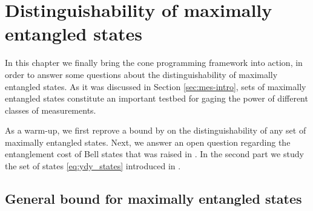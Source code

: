 \chapter{Distinguishability of maximally entangled states}
\label{chap:mes}

In this chapter we finally bring the cone programming framework into action, 
in order to answer some questions about the distinguishability of maximally entangled states.
As it was discussed in Section \ref{sec:mes-intro}, sets of maximally entangled states
constitute an important testbed for gaging the power of different classes of measurements.

As a warm-up, we first reprove a bound by \cite{Yu12} on the distinguishability
of any set of maximally entangled states.
Next, we answer an open question regarding the entanglement
cost of Bell states that was raised in \cite{Yu14}.
In the second part we study the set of states \eqref{eq:ydy_states} introduced in \cite{Yu12}. 

\minitoc

\section{General bound for maximally entangled states}
\label{sec:nathansons-bound}

